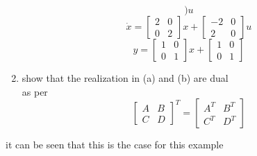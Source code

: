 \begin{enumerate}
\begin{equation}
      \big )u
    \end{equation}
    \begin{equation}
      \dot x =
      \begin{bmatrix}
        2 & 0 \\
        0 & 2
      \end{bmatrix}x +
      \begin{bmatrix}
        -2 & 0 \\
        2 & 0
      \end{bmatrix}u
    \end{equation}
    \begin{equation}
      y =
      \begin{bmatrix}
        1 & 0 \\
        0 & 1
      \end{bmatrix}x +
      \begin{bmatrix}
        1 & 0 \\
        0 & 1
      \end{bmatrix}
    \end{equation}
  \item show that the realization in (a) and (b) are dual\\
    as per
    \begin{equation}
      \begin{bmatrix}
        A & B \\
        C & D
      \end{bmatrix}^T =
      \begin{bmatrix}
        A^T & B^T \\
        C^T & D^T
      \end{bmatrix}
    \end{equation}
  \end{enumerate}
  it can be seen that this is the case for this example